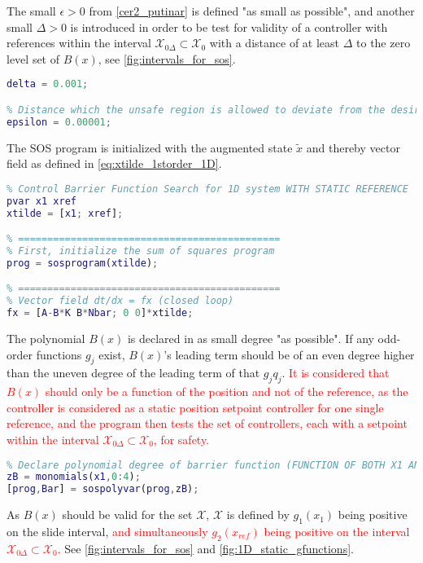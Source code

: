 The small $\epsilon>0$ from \autoref{cer2_putinar} is defined "as small as possible", and another small $\Delta>0$ is introduced in order to be test for validity of a controller with references within the interval $\mathcal{X}_{0\Delta} \subset \mathcal{X}_0$ with a distance of at least $\Delta$ to the zero level set of $B(x)$, see \autoref{fig:intervals_for_sos}.
\begin{lstlisting}[language=matlab]
% Distance reference should keep to the unsafe region
delta = 0.001;

% Distance which the unsafe region is allowed to deviate from the desired zero level set specified by the g(x) defining Xu
epsilon = 0.00001;
\end{lstlisting}
The SOS program is initialized with the augmented state $\tilde{x}$ and thereby vector field as defined in \autoref{eq:xtilde_1storder_1D}. 
\begin{lstlisting}[language=matlab]
% =============================================
% Control Barrier Function Search for 1D system WITH STATIC REFERENCE
pvar x1 xref
xtilde = [x1; xref];

% =============================================
% First, initialize the sum of squares program
prog = sosprogram(xtilde);

% =============================================
% Vector field dt/dx = fx (closed loop)
fx = [A-B*K B*Nbar; 0 0]*xtilde;
\end{lstlisting}
The polynomial $B(x)$ is declared in as small degree "as possible". If any odd-order functions $g_j$ exist, $B(x)$'s leading term should be of an even degree higher than the uneven degree of the leading term of that $g_jq_j$. \textcolor{red}{It is considered that $B(x)$ should only be a function of the position and not of the reference, as the controller is considered as a static position setpoint controller for one single reference, and the program then tests the set of controllers, each with a setpoint within the interval $\mathcal{X}_{0\Delta} \subset \mathcal{X}_0$, for safety.}
\begin{lstlisting}[language=matlab]
% =============================================
% Declare polynomial degree of barrier function (FUNCTION OF BOTH X1 AND XREF?)
zB = monomials(x1,0:4);
[prog,Bar] = sospolyvar(prog,zB);
\end{lstlisting}
As $B(x)$ should be valid for the set $\mathcal{X}$, $\mathcal{X}$ is defined by $g_1(x_1)$ being positive on the slide interval, \textcolor{red}{and simultaneously $g_2(x_{ref})$ being positive on the interval $\mathcal{X}_{0\Delta} \subset \mathcal{X}_0$.} See \autoref{fig:intervals_for_sos} and \ref{fig:1D_static_gfunctions}.

